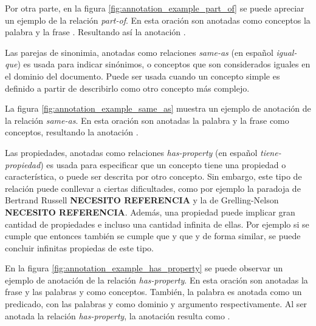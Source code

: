 Por otra parte, en la figura \ref{fig:annotation_example_part_of} se puede apreciar un ejemplo de la relación \textit{part-of}. En esta oración son anotadas como conceptos la palabra  y la frase . Resultando así la anotación .

Las parejas de sinonimia, anotadas como relaciones \textit{same-as} (en español \textit{igual-que}) es usada para indicar sinónimos, o conceptos que son considerados iguales en el dominio del documento. Puede ser usada cuando un concepto simple es definido a partir de describirlo como otro concepto más complejo.

La figura \ref{fig:annotation_example_same_as} muestra un ejemplo de anotación de la relación \textit{same-as}. En esta oración son anotadas la palabra  y la frase  como conceptos, resultando la anotación .

Las propiedades, anotadas como relaciones \textit{has-property} (en español \textit{tiene-propiedad}) es usada para especificar que un concepto tiene una propiedad o característica, o puede ser descrita por otro concepto. Sin embargo, este tipo de relación puede conllevar a ciertas dificultades, como por ejemplo la paradoja de Bertrand Russell \textbf{NECESITO REFERENCIA} y la de Grelling-Nelson \textbf{NECESITO REFERENCIA}. Además, una propiedad puede implicar gran cantidad de propiedades e incluso una cantidad infinita de ellas. Por ejemplo si se cumple que  entonces también se cumple que  y que  y de forma similar, se puede concluir infinitas propiedas de este tipo.

En la figura \ref{fig:annotation_example_has_property} se puede observar un ejemplo de anotación de la relación \textit{has-property}. En esta oración son anotadas la frase  y las palabras  y  como conceptos. También, la palabra  es anotada como un predicado, con las palabras  y  como dominio y argumento respectivamente. Al ser anotada la relación \textit{has-property}, la anotación resulta como .

